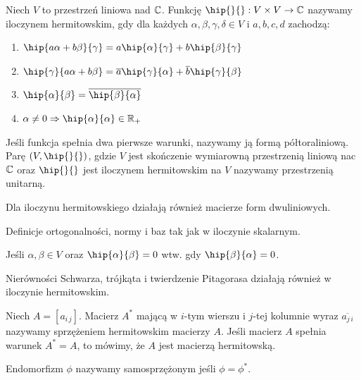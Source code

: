 \documentclass[11pt, a4paper]{article}
\begin{document}
\begin{definition}
    Niech \(V\) to przestrzeń liniowa nad \(\mathbb{C}\). Funkcję \(\hip{}{} : V \times V \to \C\)
	nazywamy iloczynem hermitowskim, gdy dla każdych \(\alpha, \beta, \gamma, \delta \in V\)
	i \(a, b, c, d\) zachodzą:
	\begin{enumerate}
		\item \(\hip{a\alpha + b \beta}{\gamma} = a\hip{\alpha}{\gamma} + b\hip{\beta}{\gamma}\)
		\item \(\hip{\gamma}{a\alpha + b \beta} = \overline{a}\hip{\gamma}{\alpha} + \overline{b}\hip{\gamma}{\beta}\)
		\item \(\hip{\alpha}{\beta} = \overline{\hip{\beta}{\alpha}}\)
		\item \(\alpha \not = 0 \Rightarrow \hip{\alpha}{\alpha} \in \R_{+}\)
    \end{enumerate}
    Jeśli funkcja spełnia dwa pierwsze warunki, nazywamy ją formą półtoraliniową.
    Parę \((V, \hip{}{} )\), gdzie \(V\) jest skończenie wymiarowną przestrzenią liniową nac \(\mathbb{C}\)
    oraz \(\hip{}{} \) jest iloczynem hermitowskim na \(V\) nazywamy przestrzenią unitarną.
\end{definition}

\begin{remark}
	Dla iloczynu hermitowskiego działają również macierze form dwuliniowych.
\end{remark}

\begin{remark}
	Definicje ortogonalności, normy i baz tak jak w iloczynie skalarnym.
\end{remark}
\begin{remark}
	Jeśli \(\alpha, \beta \in V\) oraz \(\hip{\alpha}{\beta} = 0\) wtw. gdy
	\(\hip{\beta}{\alpha} = 0\).
\end{remark}

\begin{remark}
	Nierówności Schwarza, trójkąta i twierdzenie Pitagorasa działają również
	w iloczynie hermitowskim.
\end{remark}

\begin{definition}
	Niech \(A = [a_{i\,j}]\). Macierz \(A^{*}\) mającą w \(i\)-tym wierszu i \(j\)-tej
	kolumnie wyraz \(\overline{a_{j\,i}}\) nazywamy sprzężeniem hermitowskim
	macierzy \(A\). Jeśli macierz \(A\) spełnia warunek \(A^{*} = A\), to
	mówimy, że \(A\) jest macierzą hermitowską.
\end{definition}

\begin{definition}
	Endomorfizm \(\phi\) nazywamy samosprzężonym jeśli \(\phi = \phi^{*}\).
\end{definition}
\end{document}
